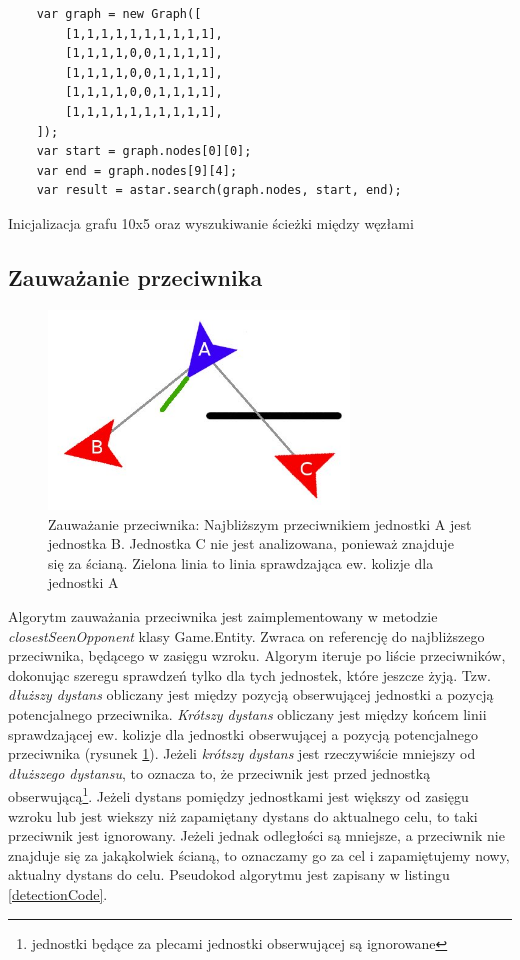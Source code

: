 \begin{table}
\begin{center}
\begin{lstlisting}
	var graph = new Graph([
		[1,1,1,1,1,1,1,1,1,1],
		[1,1,1,1,0,0,1,1,1,1],
		[1,1,1,1,0,0,1,1,1,1],
		[1,1,1,1,0,0,1,1,1,1],
		[1,1,1,1,1,1,1,1,1,1],
	]);
	var start = graph.nodes[0][0];
	var end = graph.nodes[9][4];
	var result = astar.search(graph.nodes, start, end);
 \end{lstlisting}
\caption {Inicjalizacja grafu 10x5 oraz wyszukiwanie ścieżki między węzłami}
\label{astarCode}
\end{center}
\end{table}

\subsection{Zauważanie przeciwnika}\label{detectionSubsection}

\begin{figure}
\begin{center}
	\includegraphics[width=80mm,height=53mm]{images/detection}
	\caption[Zauważanie przeciwnika]{Zauważanie przeciwnika: Najbliższym przeciwnikiem jednostki A jest jednostka B. Jednostka C nie jest analizowana, ponieważ znajduje się za ścianą. Zielona linia to linia sprawdzająca ew. kolizje dla jednostki A\label{detectionImage}}
\end{center}
\end{figure}

Algorytm zauważania przeciwnika jest zaimplementowany w metodzie \emph{closestSeenOpponent} klasy Game.Entity. Zwraca on referencję do najbliższego przeciwnika, będącego w zasięgu wzroku. Algorym iteruje po liście przeciwników, dokonując szeregu sprawdzeń tylko dla tych jednostek, które jeszcze żyją. Tzw. \emph{dłuższy dystans} obliczany jest między pozycją obserwującej jednostki a pozycją potencjalnego przeciwnika. \emph{Krótszy dystans} obliczany jest między końcem linii sprawdzającej ew. kolizje dla jednostki obserwującej a pozycją potencjalnego przeciwnika (rysunek \ref{detectionImage}). Jeżeli \emph{krótszy dystans} jest rzeczywiście mniejszy od \emph{dłuższego dystansu}, to oznacza to, że przeciwnik jest przed jednostką obserwującą\footnote{jednostki będące za plecami jednostki obserwującej są ignorowane}. Jeżeli dystans pomiędzy jednostkami jest większy od zasięgu wzroku lub jest wiekszy niż zapamiętany dystans do aktualnego celu, to taki przeciwnik jest ignorowany. Jeżeli jednak odległości są mniejsze, a przeciwnik nie znajduje się za jakąkolwiek ścianą, to oznaczamy go za cel i zapamiętujemy nowy, aktualny dystans do celu. Pseudokod algorytmu jest zapisany w listingu \ref{detectionCode}.

